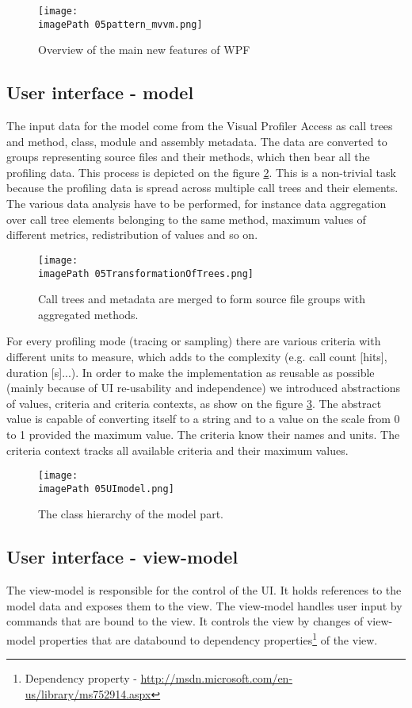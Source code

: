 \begin{figure}
	\centering
		\texttt{[image: \\imagePath 05pattern\_mvvm.png]}
		\caption{Overview of the main new features of WPF \cite{WPFpage}}
	\label{fig:05pattern_mvvm}
\end{figure}

\subsection{User interface - model}
The input data for the model come from the Visual Profiler Access as call trees and method, class, module and assembly metadata. The data are converted to groups representing source files and their methods, which then bear all the profiling data. This process is depicted on the figure \ref{fig:05TransformationOfTrees}. This is a non-trivial task because the profiling data is spread across multiple call trees and their elements. The various data analysis have to be performed, for instance data aggregation over call tree elements belonging to the same method, maximum values of different metrics, redistribution of values and so on.

 \begin{figure}
	\centering
		\texttt{[image: \\imagePath 05TransformationOfTrees.png]}
		\caption{Call trees and metadata are merged to form source file groups with aggregated methods.}
	\label{fig:05TransformationOfTrees}
\end{figure}

For every profiling mode (tracing or sampling) there are various criteria with different units to measure, which adds to the complexity (e.g. call count [hits], duration [s]...). In order to make the implementation as reusable as possible (mainly because of UI re-usability and independence) we introduced abstractions of values, criteria and criteria contexts, as show on the figure \ref{fig:05UImodel}. The abstract value is capable of converting itself to a string and to a value on the scale from 0 to 1 provided the maximum value. The criteria know their names and units. The criteria context tracks all available criteria and their maximum values. 

 \begin{figure}
	\centering
		\texttt{[image: \\imagePath 05UImodel.png]}
		\caption{The class hierarchy of the model part.}
	\label{fig:05UImodel}
\end{figure}

\subsection{User interface - view-model}
The view-model is responsible for the control of the UI. It holds references to the model data and exposes them to the view. The view-model handles user input by commands that are bound to the view. It controls the view by changes of view-model properties that are databound to dependency properties\footnote{Dependency property - \href{http://msdn.microsoft.com/en-us/library/ms752914.aspx}{http://msdn.microsoft.com/en-us/library/ms752914.aspx}} of the view.

